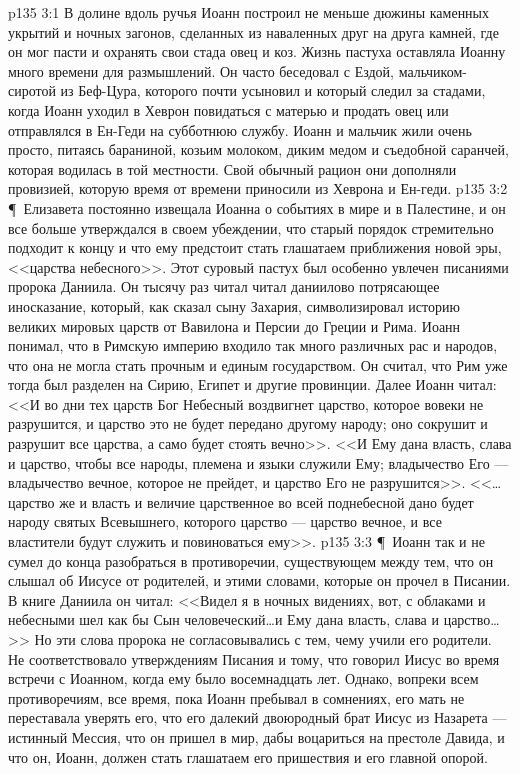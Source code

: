 \vs p135 3:1 В долине вдоль ручья Иоанн построил не меньше дюжины каменных укрытий и ночных загонов, сделанных из наваленных друг на друга камней, где он мог пасти и охранять свои стада овец и коз. Жизнь пастуха оставляла Иоанну много времени для размышлений. Он часто беседовал с Ездой, мальчиком\hyp{}сиротой из Беф\hyp{}Цура, которого почти усыновил и который следил за стадами, когда Иоанн уходил в Хеврон повидаться с матерью и продать овец или отправлялся в Ен\hyp{}Геди на субботнюю службу. Иоанн и мальчик жили очень просто, питаясь бараниной, козьим молоком, диким медом и съедобной саранчей, которая водилась в той местности. Свой обычный рацион они дополняли провизией, которую время от времени приносили из Хеврона и Ен\hyp{}геди.
\vs p135 3:2 \P\ Елизавета постоянно извещала Иоанна о событиях в мире и в Палестине, и он все больше утверждался в своем убеждении, что старый порядок стремительно подходит к концу и что ему предстоит стать глашатаем приближения новой эры, <<царства небесного>>. Этот суровый пастух был особенно увлечен писаниями пророка Даниила. Он тысячу раз читал читал даниилово потрясающее иносказание, который, как сказал сыну Захария, символизировал историю великих мировых царств от Вавилона и Персии до Греции и Рима. Иоанн понимал, что в Римскую империю входило так много различных рас и народов, что она не могла стать прочным и единым государством. Он считал, что Рим уже тогда был разделен на Сирию, Египет и другие провинции. Далее Иоанн читал: <<И во дни тех царств Бог Небесный воздвигнет царство, которое вовеки не разрушится, и царство это не будет передано другому народу; оно сокрушит и разрушит все царства, а само будет стоять вечно>>. <<И Ему дана власть, слава и царство, чтобы все народы, племена и языки служили Ему; владычество Его --- владычество вечное, которое не прейдет, и царство Его не разрушится>>. <<\ldots  царство же и власть и величие царственное во всей поднебесной дано будет народу святых Всевышнего, которого царство --- царство вечное, и все властители будут служить и повиноваться ему>>.
\vs p135 3:3 \P\ Иоанн так и не сумел до конца разобраться в противоречии, существующем между тем, что он слышал об Иисусе от родителей, и этими словами, которые он прочел в Писании. В книге Даниила он читал: <<Видел я в ночных видениях, вот, с облаками и небесными шел как бы Сын человеческий\ldots  и Ему дана власть, слава и царство\ldots >> Но эти слова пророка не согласовывались с тем, чему учили его родители. Не соответствовало утверждениям Писания и тому, что говорил Иисус во время встречи с Иоанном, когда ему было восемнадцать лет. Однако, вопреки всем противоречиям, все время, пока Иоанн пребывал в сомнениях, его мать не переставала уверять его, что его далекий двоюродный брат Иисус из Назарета --- истинный Мессия, что он пришел в мир, дабы воцариться на престоле Давида, и что он, Иоанн, должен стать глашатаем его пришествия и его главной опорой.
